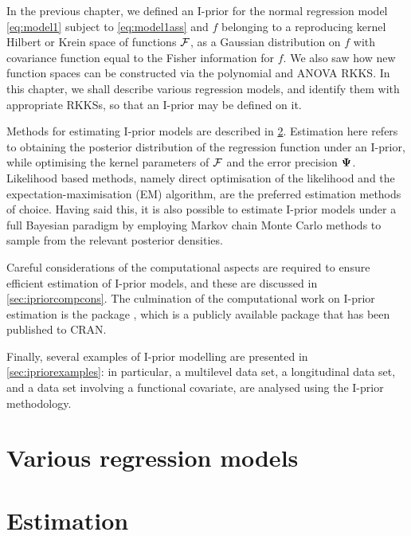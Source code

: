\documentclass[a4paper,showframe,11pt]{report}
\begin{document}

In the previous chapter, we defined an I-prior for the normal regression model \cref{eq:model1} subject to \cref{eq:model1ass} and $f$ belonging to a reproducing kernel Hilbert or Krein space of functions ${\mathcal F}$, as a Gaussian distribution on $f$ with covariance function equal to the Fisher information for $f$.
We also saw how new function spaces can be constructed via the polynomial and ANOVA RKKS.
In this chapter, we shall describe various regression models, and identify them with appropriate RKKSs, so that an I-prior may be defined on it.

Methods for estimating I-prior models are described in \cref{sec:ipriorestimation}.
Estimation here refers to obtaining the posterior distribution of the regression function under an I-prior, while optimising the kernel parameters of ${\mathcal F}$ and the error precision ${\bm\Psi}$.
Likelihood based methods, namely direct optimisation of the likelihood and the expectation-maximisation (EM) algorithm, are the preferred estimation methods of choice.
Having said this, it is also possible to estimate I-prior models under a full Bayesian paradigm by employing Markov chain Monte Carlo methods to sample from the relevant posterior densities.

Careful considerations of the computational aspects are required to ensure efficient estimation of I-prior models, and these are discussed in \cref{sec:ipriorcompcons}.
The culmination of the computational work on I-prior estimation is the  package \citep{jamil2017}, which is a publicly available  package that has been published to CRAN.

Finally, several examples of I-prior modelling are presented in  \cref{sec:ipriorexamples}: in particular, a multilevel data set, a longitudinal data set, and a data set involving a functional covariate, are analysed using the I-prior methodology.

\section{Various regression models}\label{sec:various-regression}


\section{Estimation}\label{sec:ipriorestimation}

\end{document}
